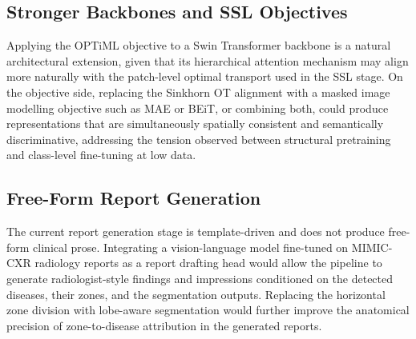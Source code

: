 \subsection{Stronger Backbones and SSL Objectives}

Applying the OPTiML objective to a Swin Transformer backbone is a natural architectural extension, given that its hierarchical attention mechanism may align more naturally with the patch-level optimal transport used in the SSL stage. On the objective side, replacing the Sinkhorn OT alignment with a masked image modelling objective such as MAE or BEiT, or combining both, could produce representations that are simultaneously spatially consistent and semantically discriminative, addressing the tension observed between structural pretraining and class-level fine-tuning at low data.

\subsection{Free-Form Report Generation}

The current report generation stage is template-driven and does not produce free-form clinical prose. Integrating a vision-language model fine-tuned on MIMIC-CXR radiology reports as a report drafting head would allow the pipeline to generate radiologist-style findings and impressions conditioned on the detected diseases, their zones, and the segmentation outputs. Replacing the horizontal zone division with lobe-aware segmentation would further improve the anatomical precision of zone-to-disease attribution in the generated reports.